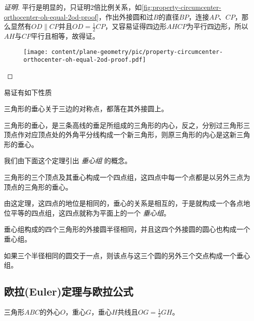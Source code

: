 \begin{proof}[证明]
  平行是明显的，只证明2倍比例关系，如\autoref{fig:property-circumcenter-orthocenter-oh-equal-2od-proof}，作出外接圆和过$B$的直径$BP$，连接$AP$、$CP$，那么显然有$OD \parallel CP$并且$OD=\frac{1}{2}CP$，又容易证得四边形$AHCP$为平行四边形，所以$AH$与$CP$平行且相等，故得证。

\begin{figure}[htbp]
\centering
\texttt{[image: content/plane-geometry/pic/property-circumcenter-orthocenter-oh-equal-2od-proof.pdf]}
\caption{}
\label{fig:property-circumcenter-orthocenter-oh-equal-2od-proof}
\end{figure}

\end{proof}

易证有如下性质
\begin{property}
  三角形的垂心关于三边的对称点，都落在其外接圆上。
\end{property}

\begin{property}
  三角形的垂心，是三条高线的垂足所组成的三角形的内心，反之，分别过三角形三顶点作对应顶点处的外角平分线构成一个新三角形，则原三角形的内心是这新三角形的垂心。
\end{property}

我们由下面这个定理引出 \emph{垂心组} 的概念。
\begin{theorem}
  三角形的三个顶点及其垂心构成一个四点组，这四点中每一个点都是以另外三点为顶点的三角形的垂心。
\end{theorem}
由这定理，这四点的地位是相同的，垂心的关系是相互的，于是就构成一个各点地位平等的四点组，这四点就称为平面上的一个 \emph{垂心组}。

\begin{property}
  垂心组构成的四个三角形的外接圆半径相同，并且这四个外接圆的圆心也构成一个垂心组。
\end{property}

\begin{property}
  如果三个半径相同的圆交于一点，则该点与这三个圆的另外三个交点构成一个垂心组。
\end{property}

\subsection{欧拉(Euler)定理与欧拉公式}
\label{sec:euler-theorem-and-euler-formula}

\begin{theorem}[欧拉(Euler)定理]
  三角形$ABC$的外心$O$，重心$G$，垂心$H$共线且$OG=\frac{1}{2}GH$。
\end{theorem}

